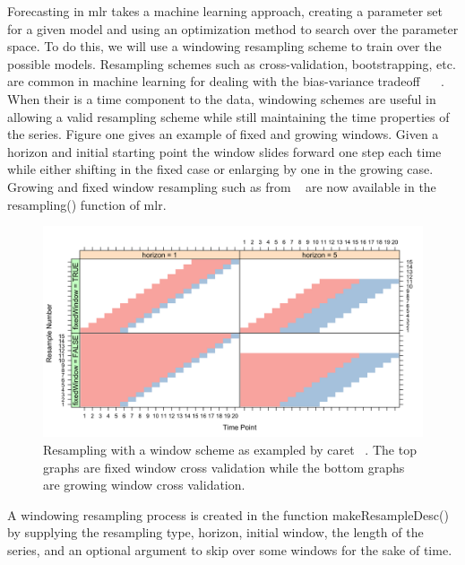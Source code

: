\documentclass[12pt]{article}\usepackage[]{graphicx}\usepackage[]{color}
\makeatletter
\theoremstyle{definition}
\newcommand\code{\@codex}
\def\@codex#1{{\normalfont\ttfamily\hyphenchar\font=-1 #1}}
\newcommand{\pkg}[1]{{\fontseries{b}\selectfont #1}}
\makeatother
\begin{document}
Forecasting in \pkg{mlr} takes a machine learning approach, creating a parameter set for a given model and using an optimization method to search over the parameter space. To do this, we will use a windowing resampling scheme to train over the possible models. Resampling schemes such as cross-validation, bootstrapping, etc. are common in machine learning for dealing with the bias-variance tradeoff ~\cite{Friedman1997} ~\cite{rodriguezkfold}. When their is a time component to the data, windowing schemes are useful in allowing a valid resampling scheme while still maintaining the time properties of the series. Figure one gives an example of fixed and growing windows. Given a horizon and initial starting point the window slides forward one step each time while either shifting in the fixed case or enlarging by one in the growing case. Growing and fixed window resampling such as from ~\cite{hyndman2014forecasting} are now available in the \code{resampling()} function of \pkg{mlr}. 

\begin{figure}[ht]
\caption{Resampling with a window scheme as exampled by caret ~\cite{windowingcaret}. The top graphs are fixed window cross validation while the bottom graphs are growing window cross validation. }
  \includegraphics[scale = .23]{windowing_pic_caret}
  \centering
\end{figure}
\newpage

A windowing resampling process is created in the function \code{makeResampleDesc()} by supplying the resampling type, horizon, initial window, the length of the series, and an optional argument to skip over some windows for the sake of time.
\end{document}
